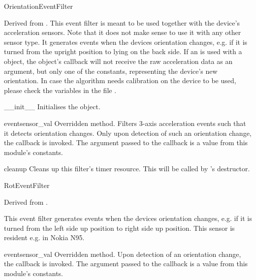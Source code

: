 \begin{classdesc*}{OrientationEventFilter}

Derived from .
This event filter is meant to be used together with the device's acceleration
sensors. Note that it does not make sense to use it with any other sensor
type. It generates events when the devices orientation changes, e.g. if it
is turned from the upright position to lying on the back side.
If an  is used with a  object,
the  object's callback will not receive the raw acceleration data
as an argument, but only one of the  constants, representing
the device's new orientation. In case the algorithm needs calibration on the
device to be used, please check the  variables
in the file .

\begin{methoddesc}[OrientationEventFilter]{__init__}{}
Initialises the  object.
\end{methoddesc}

\begin{methoddesc}[OrientationEventFilter]{event}{sensor_val}
Overridden method. Filters 3-axis acceleration events such that
it detects orientation changes. Only upon detection of such an orientation
change, the callback is invoked. The argument passed to the callback is a
value from this module's  constants.
\end{methoddesc}

\begin{methoddesc}[OrientationEventFilter]{cleanup}{}
Cleans up this filter's timer resource. This will be called by 's
destructor.
\end{methoddesc}

\end{classdesc*}

\begin{classdesc*}{RotEventFilter}

Derived from .

This event filter generates events when the devices orientation changes, e.g. if 
it is turned from the left side up position to right side up position. This 
sensor is resident e.g. in Nokia N95.

\begin{methoddesc}[OrientationEventFilter]{event}{sensor_val}
Overridden method. Upon detection of an orientation change, the callback is 
invoked. The argument passed to the callback is a value from this module's 
 constants.
\end{methoddesc}

\end{classdesc*}
